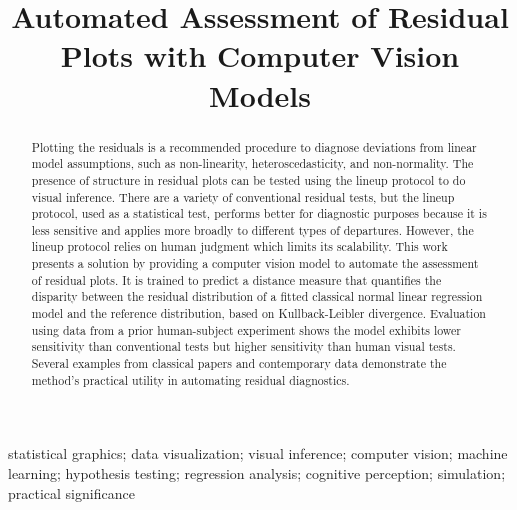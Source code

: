 \documentclass[]{interact}
\theoremstyle{plain}%
\theoremstyle{definition}
\theoremstyle{remark}
\begin{document}
\articletype{}

\title{Automated Assessment of Residual Plots with Computer Vision
Models}


\author{
}


\maketitle

\begin{abstract}
Plotting the residuals is a recommended procedure to diagnose deviations
from linear model assumptions, such as non-linearity,
heteroscedasticity, and non-normality. The presence of structure in
residual plots can be tested using the lineup protocol to do visual
inference. There are a variety of conventional residual tests, but the
lineup protocol, used as a statistical test, performs better for
diagnostic purposes because it is less sensitive and applies more
broadly to different types of departures. However, the lineup protocol
relies on human judgment which limits its scalability. This work
presents a solution by providing a computer vision model to automate the
assessment of residual plots. It is trained to predict a distance
measure that quantifies the disparity between the residual distribution
of a fitted classical normal linear regression model and the reference
distribution, based on Kullback-Leibler divergence. Evaluation using
data from a prior human-subject experiment shows the model exhibits
lower sensitivity than conventional tests but higher sensitivity than
human visual tests. Several examples from classical papers and
contemporary data demonstrate the method's practical utility in
automating residual diagnostics.
\end{abstract}

\begin{keywords}
statistical graphics; data visualization; visual inference; computer
vision; machine learning; hypothesis testing; regression analysis;
cognitive perception; simulation; practical significance
\end{keywords}
\end{document}
